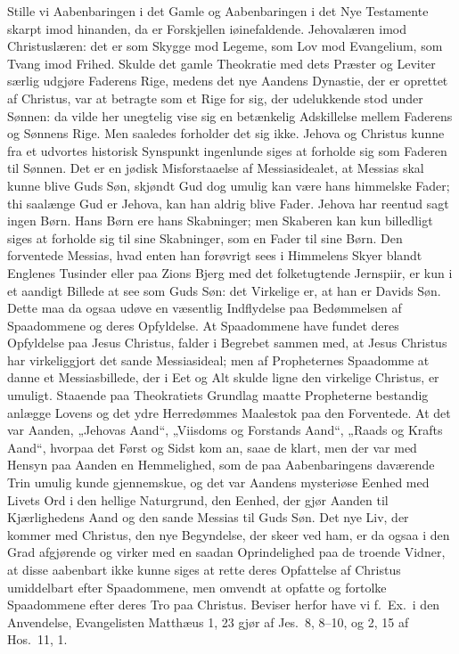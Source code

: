 \documentclass[12pt]{book}
\begin{document}
Stille vi Aabenbaringen i det Gamle og Aabenbaringen i det Nye
Testamente skarpt imod hinanden, da er Forskjellen iøinefaldende.
Jehovalæren imod Christuslæren: det er som Skygge mod Legeme, som
Lov mod Evangelium, som Tvang imod Frihed. Skulde det gamle
Theokratie med dets Præster og Leviter særlig udgjøre Faderens Rige,
medens det nye Aandens Dynastie, der er oprettet af Christus, var at
betragte som et Rige for sig, der udelukkende stod under Sønnen: da
vilde her unegtelig vise sig en betænkelig Adskillelse mellem
Faderens og Sønnens Rige. Men saaledes forholder det sig ikke.
Jehova og Christus kunne fra et udvortes historisk Synspunkt
ingenlunde siges at forholde sig som Faderen til Sønnen. Det er en
jødisk Misforstaaelse af Messiasidealet, at Messias skal kunne blive
Guds Søn, skjøndt Gud dog umulig kan være hans himmelske Fader; thi
saalænge Gud er Jehova, kan han aldrig blive Fader. Jehova har
reentud sagt ingen Børn. Hans Børn ere hans Skabninger; men Skaberen
kan kun billedligt siges at forholde sig til sine Skabninger, som en
Fader til sine Børn. Den forventede Messias, hvad enten han
forøvrigt sees i Himmelens Skyer blandt Englenes Tusinder eller paa
Zions Bjerg med det folketugtende Jernspiir, er kun i et aandigt
Billede at see som Guds Søn: det Virkelige er, at han er Davids Søn.
Dette maa da ogsaa udøve en væsentlig Indflydelse paa Bedømmelsen af
Spaadommene og deres Opfyldelse. At Spaadommene have fundet deres
Opfyldelse paa Jesus Christus, falder i Begrebet sammen med, at
Jesus Christus har virkeliggjort det sande Messiasideal; men af
Propheternes Spaadomme at danne et Messiasbillede, der i Eet og Alt
skulde ligne den virkelige Christus, er umuligt. Staaende paa
Theokratiets Grundlag maatte Propheterne bestandig anlægge Lovens og
det ydre Herredømmes Maalestok paa den Forventede. At det var
Aanden, „Jehovas Aand“, „Viisdoms og Forstands Aand“, „Raads og
Krafts Aand“, hvorpaa det Først og Sidst kom an, saae de klart, men
der var med Hensyn paa Aanden en Hemmelighed, som de paa
Aabenbaringens daværende Trin umulig kunde gjennemskue, og det var
Aandens mysteriøse Eenhed med Livets Ord i den hellige Naturgrund,
den Eenhed, der gjør Aanden til Kjærlighedens Aand og den sande
Messias til Guds Søn. Det nye Liv, der kommer med Christus, den nye
Begyndelse, der skeer ved ham, er da ogsaa i den Grad afgjørende og
virker med en saadan Oprindelighed paa de troende Vidner, at disse
aabenbart ikke kunne siges at rette deres Opfattelse af Christus
umiddelbart efter Spaadommene, men omvendt at opfatte og fortolke
Spaadommene efter deres Tro paa Christus. Beviser herfor have vi
f.\ Ex.\ i den Anvendelse, Evangelisten Matthæus 1, 23 gjør af
Jes.\ 8, 8--10, og 2, 15 af Hos.\ 11, 1.
\end{document}
